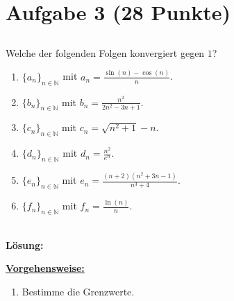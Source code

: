 \section*{Aufgabe 3 (28 Punkte)}
\vspace{0.4cm}
\subsection*{}
Welche der folgenden Folgen konvergiert gegen $1$?
\renewcommand{\labelenumi}{(\alph{enumi})}
\begin{enumerate}
	\item 
	$ \{a_n\}_{n \in \mathbb{N}} $ mit $a_n = \frac{\sin(n) - \cos(n)}{n}$.
	\item
	$ \{b_n\}_{n \in \mathbb{N}} $ mit $b_n = \frac{n^2}{2n^2 - 3n +1 }$.
	\item
	$ \{c_n\}_{n \in \mathbb{N}} $ mit $c_n = \sqrt{n^2 + 1 }  - n$.
	\item
	$ \{d_n\}_{n \in \mathbb{N}} $ mit $d_n = \frac{n^2}{e^n}$.
	\item
	$ \{e_n\}_{n \in \mathbb{N}} $ mit $e_n = \frac{(n+2)(n^2 + 3n -1 )}{n^3 + 4 }$.
	\item
	$ \{f_n\}_{n \in \mathbb{N}} $ mit $f_n = \frac{\ln(n)}{n}$.
\end{enumerate}
\ \\
\textbf{Lösung:}
\begin{mdframed}
\underline{\textbf{Vorgehensweise:}}
\renewcommand{\labelenumi}{\theenumi.}
\begin{enumerate}
\item Bestimme die Grenzwerte.
\end{enumerate}
\end{mdframed}

